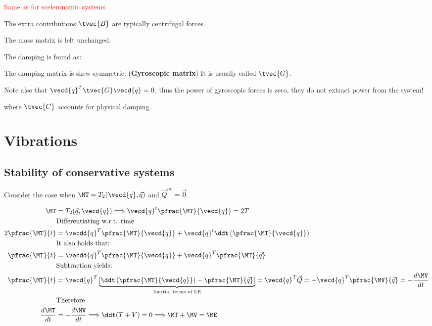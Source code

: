 \documentclass[10pt,a4paper]{scrartcl}
\begin{document}
\begin{multicols*}{2}
\textcolor{red}{Same as for sceleronomic systems}

The extra contributions $\tvec{B}$ are typically centrifugal forces.

\vspace{3ex}

The mass matrix is left unchanged.


The damping is found as:


The damping matrix is skew symmetric. (\textbf{Gyroscopic matrix}) It is usually called $\tvec{G}$.


Note also that $\vecd{q}^T\tvec{G}\vecd{q}=0$, thus the power of gyroscopic forces is zero, they do not extract power from the system!


where $\tvec{C}$ accounts for physical damping.

\section{Vibrations}

\subsection{Stability of conservative systems}

Consider the case when $\MT = T_2(\vecd{q},\vec{q})$ and $\vec{Q}^{nc}=\vec{0}$.

\begin{align*}
\MT&=T_2(\vec{q},\vecd{q})\Longrightarrow \vecd{q}^t\pfrac{\MT}{\vecd{q}}=2T\\
&\text{Differentiating w.r.t. time}\\
2\pfrac{\MT}{t}&=\vecdd{q}^T\pfrac{\MT}{\vecd{q}}+\vecd{q}^t\ddt\left(\pfrac{\MT}{\vecd{q}}\right)\\
&\text{It also holds that:}\\
\pfrac{\MT}{t}&=\vecdd{q}^T\pfrac{\MT}{\vecd{q}}+\vecd{q}^T\pfrac{\MT}{\vec{q}}\\
&\text{Subtraction yields:}\\
\pfrac{\MT}{t}&=\vecd{q}^T\underbrace{\left[\ddt\left(\pfrac{\MT}{\vecd{q}}\right)-\pfrac{\MT}{\vec{q}}\right]}_{\text{Inertial terms of LE}}=\vecd{q}^T\vec{Q}=-\vecd{q}^T\pfrac{\MV}{\vec{q}}=-\frac{d\MV}{dt}\\
&\text{Therefore}\\
\frac{d\MT}{dt}&=-\frac{d\MV}{dt}\Longrightarrow\ddt(T+V)=0\Longrightarrow \MT+\MV=\ME
\end{align*}


\end{multicols*}
\end{document}
